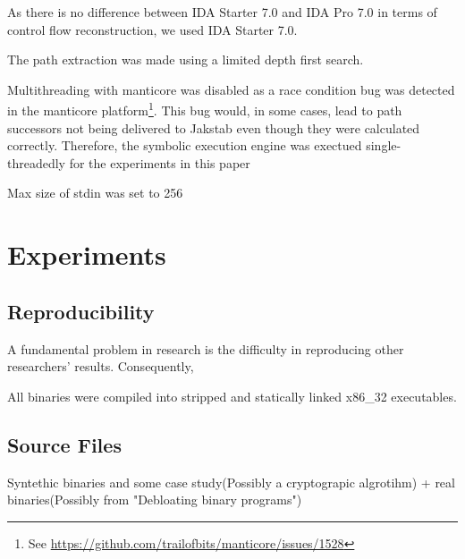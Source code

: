 \documentclass{kththesis}
\begin{document}




As there is no difference between IDA Starter 7.0 and IDA Pro 7.0 in terms of control flow reconstruction\cite{IDAPersonalCommunication}, we used IDA Starter 7.0.

The path extraction was made using a limited depth first search.

Multithreading with manticore was disabled as a race condition bug was detected in the manticore platform\footnote{See \url{https://github.com/trailofbits/manticore/issues/1528}}. This bug would, in some cases, lead to path successors not being delivered to Jakstab even though they were calculated correctly. Therefore, the symbolic execution engine was exectued single-threadedly for the experiments in this paper

Max size of stdin was set to 256

\section{Experiments}
\subsection{Reproducibility}
A fundamental problem in research is the difficulty in reproducing other researchers' results. Consequently, 

All binaries were compiled into stripped and statically linked x86\_32 executables.


\subsection{Source Files}
Syntethic binaries and some case study(Possibly a cryptograpic algrotihm) + real binaries(Possibly from "Debloating binary programs")
\end{document}
